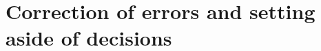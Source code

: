 \documentclass[12pt,a4paper]{article}
\begin{document}
%
%
%
%
%
%
%
%
%
%
%
%
%
%
%
%
%
%
%
%
%
\section*{Correction of errors and setting aside of decisions}
\end{document}
